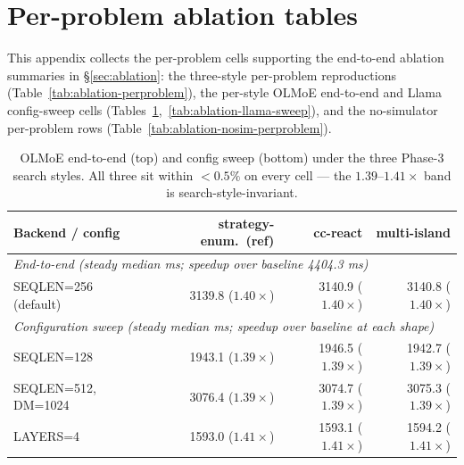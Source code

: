 \section{Per-problem ablation tables}
\label{sec:perproblem-ablation-tables}
This appendix collects the per-problem cells supporting the
end-to-end ablation summaries in §\ref{sec:ablation}: the
three-style per-problem reproductions (Table~\ref{tab:ablation-perproblem}),
the per-style OLMoE end-to-end and Llama config-sweep cells
(Tables~\ref{tab:ablation-e2e},~\ref{tab:ablation-llama-sweep}),
and the no-simulator per-problem rows (Table~\ref{tab:ablation-nosim-perproblem}).

\begin{table}[!htbp]
\centering\small
\setlength{\tabcolsep}{4pt}
\begin{tabular}{lrrr}
\toprule
\textbf{Backend / config} & \textbf{strategy-enum.\ (ref)} & \textbf{cc-react} & \textbf{multi-island} \\
\midrule
\multicolumn{4}{l}{\textit{End-to-end (steady median ms; speedup over baseline 4404.3 ms)}} \\
SEQLEN=256 (default)          & 3139.8 ($1.40\times$) & 3140.9 ($1.40\times$) & 3140.8 ($1.40\times$) \\
\midrule
\multicolumn{4}{l}{\textit{Configuration sweep (steady median ms; speedup over baseline at each shape)}} \\
SEQLEN=128                    & 1943.1 ($1.39\times$) & 1946.5 ($1.39\times$) & 1942.7 ($1.39\times$) \\
SEQLEN=512, DM=1024           & 3076.4 ($1.39\times$) & 3074.7 ($1.39\times$) & 3075.3 ($1.39\times$) \\
LAYERS=4                      & 1593.0 ($1.41\times$) & 1593.1 ($1.41\times$) & 1594.2 ($1.41\times$) \\
\bottomrule
\end{tabular}
\caption{OLMoE end-to-end (top) and config sweep (bottom) under the three Phase-3 search styles.
All three sit within $<0.5\%$ on every cell — the $1.39$--$1.41\times$ band is search-style-invariant.}
\label{tab:ablation-e2e}
\end{table}

